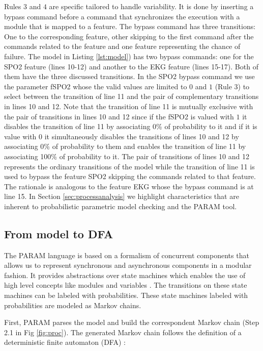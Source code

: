 \documentclass[conference]{IEEEtran}
\begin{document}
	 
	 Rules $3$ and $4$ are specific tailored to handle variability.
	 It is done by inserting a bypass command before a command that synchronizes 
	 the execution with a module that is mapped to a feature. The bypass command
	 has three transitions: One to the corresponding feature, other skipping to the
	 first command after the commands related to the feature and one feature representing
	 the chance of failure. The model in Listing \ref{lst:model}) has two bypass
	 commands: one for the SPO2 feature (lines 10-12) and another to the EKG feature (lines 15-17).
	 Both of them have the three discussed transitions. In the SPO2 bypass command we 
	 use the parameter fSPO2 whose the valid values are limited to $0$ and $1$ (Rule $3$)
	 to select between the transition of line 11 and the pair of complementary transitions 
	 in lines 10 and 12. Note that the transition of line 11 is
	  mutually exclusive with the pair of transitions in lines 10 and 12 since if the 
	  fSPO2 is valued with $1$ it disables the transition of line 11 by associating 0\%
	  of probability to it and if it is value with $0$ it simultaneously disables the
	  transitions of lines 10 and 12 by associating 0\%
	  of probability to them and enables the transition of line 11 by associating 100\% of
	  probability to it. The pair of transitions of lines 10 and 12 represents the ordinary transitions
	  of the model while the transition of line 11 is used to bypass the feature SPO2 
	  skipping the commands related to that feature. The rationale is analogous
	  to the feature EKG whose the bypass command is at line 15. In Section \ref{sec:processanalysis} we 
	  highlight characteristics that are inherent to probabilistic parametric model checking and the PARAM tool.
	
	

\subsection{From model to DFA}
\label{sec:model2dfa}

	The PARAM language is based on a formalism of concurrent components that
	allows us to represent synchronous and asynchronous components in a modular fashion. It provides
	abstractions over state machines which enables the use of high level concepts like modules and variables \cite{alur}.
	The transitions on these state machines can be labeled with probabilities. These state machines
	labeled with probabilities are modeled as Markov chains.
	
	First, PARAM parses the model and build the correspondent Markov chain (Step 2.1 in Fig \ref{fig:proc}). The generated Markov chain
	follows the definition of a deterministic finite automaton (DFA) \cite{hopcroft}:
	
\end{document}
